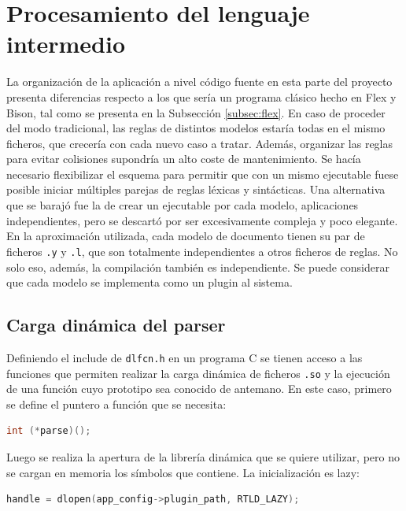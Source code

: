 \section{Procesamiento del lenguaje intermedio}

La organización de la aplicación a nivel código fuente en esta parte del proyecto presenta diferencias respecto a los que sería un programa clásico hecho en Flex y Bison, tal como se presenta en la Subsección \ref{subsec:flex}. En caso de proceder del modo tradicional, las reglas de distintos modelos estaría todas en el mismo ficheros, que crecería con cada nuevo caso a tratar. Además, organizar las reglas para evitar colisiones supondría un alto coste de mantenimiento. Se hacía necesario flexibilizar el esquema  para permitir que con un mismo ejecutable fuese posible iniciar múltiples parejas de reglas léxicas y sintácticas. Una alternativa que se barajó fue la de crear un ejecutable por cada modelo, aplicaciones independientes, pero se descartó por ser excesivamente compleja y poco elegante. En la aproximación utilizada, cada modelo de documento tienen su par de ficheros \verb|.y| y \verb|.l|, que son totalmente independientes a otros ficheros de reglas. No solo eso, además, la compilación también es independiente. Se puede considerar que cada modelo se implementa como un plugin al sistema.


\subsection{Carga dinámica del parser}

Definiendo el include de \verb|dlfcn.h| en un programa C se tienen acceso a las funciones que permiten realizar la carga dinámica de ficheros \verb|.so| y la ejecución de una función cuyo prototipo sea conocido de antemano. En este caso, primero se define el puntero a función que se necesita:

\begin{lstlisting}[language=C,caption={},label={}]
int (*parse)();
\end{lstlisting}

Luego se realiza la apertura de la librería dinámica que se quiere utilizar, pero no se cargan en memoria los símbolos que contiene. La inicialización es lazy:

\begin{lstlisting}[language=C,caption={},label={}]
handle = dlopen(app_config->plugin_path, RTLD_LAZY);
\end{lstlisting}

